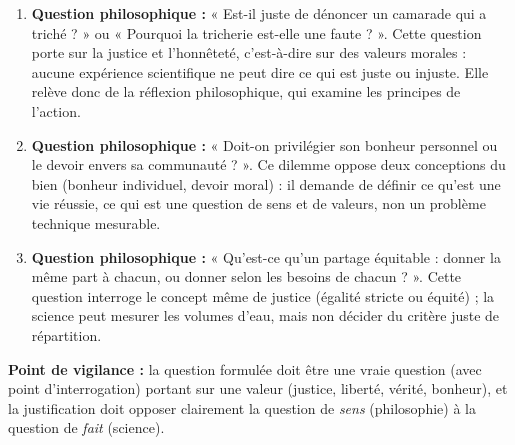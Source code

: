 \documentclass[11pt]{article}
\begin{document}
\begin{corrige}
\begin{enumerate}
\item \textbf{Question philosophique :} « Est-il juste de dénoncer un camarade qui a triché ? » ou « Pourquoi la tricherie est-elle une faute ? ». Cette question porte sur la justice et l'honnêteté, c'est-à-dire sur des valeurs morales : aucune expérience scientifique ne peut dire ce qui est juste ou injuste. Elle relève donc de la réflexion philosophique, qui examine les principes de l'action.
\item \textbf{Question philosophique :} « Doit-on privilégier son bonheur personnel ou le devoir envers sa communauté ? ». Ce dilemme oppose deux conceptions du bien (bonheur individuel, devoir moral) : il demande de définir ce qu'est une vie réussie, ce qui est une question de sens et de valeurs, non un problème technique mesurable.
\item \textbf{Question philosophique :} « Qu'est-ce qu'un partage équitable : donner la même part à chacun, ou donner selon les besoins de chacun ? ». Cette question interroge le concept même de justice (égalité stricte ou équité) ; la science peut mesurer les volumes d'eau, mais non décider du critère juste de répartition.
\end{enumerate}
\textbf{Point de vigilance :} la question formulée doit être une vraie question (avec point d'interrogation) portant sur une valeur (justice, liberté, vérité, bonheur), et la justification doit opposer clairement la question de \emph{sens} (philosophie) à la question de \emph{fait} (science).
\end{corrige}
\end{document}
